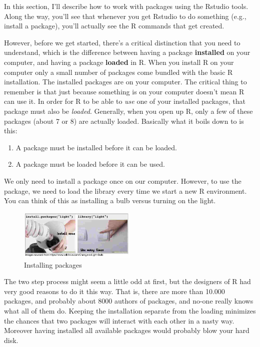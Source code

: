 \documentclass[
  12pt,
  oneside]{book}
\providecommand{\tightlist}{%
  \setlength{\itemsep}{0pt}\setlength{\parskip}{0pt}}
\begin{document}
In this section, I'll describe how to work with packages using the Rstudio tools. Along the way, you'll see that whenever you get Rstudio to do something (e.g., install a package), you'll actually see the R commands that get created.

However, before we get started, there's a critical distinction that you need to understand, which is the difference between having a package \textbf{installed} on your computer, and having a package \textbf{loaded} in R. When you install R on your computer only a small number of packages come bundled with the basic R installation. The installed packages are on your computer. The critical thing to remember is that just because something is on your computer doesn't mean R can use it. In order for R to be able to \emph{use} one of your installed packages, that package must also be \emph{loaded}. Generally, when you open up R, only a few of these packages (about 7 or 8) are actually loaded. Basically what it boils down to is this:

\begin{enumerate}
\def\labelenumi{\arabic{enumi}.}
\tightlist
\item
  A package must be installed before it can be loaded.
\item
  A package must be loaded before it can be used.
\end{enumerate}

We only need to install a package once on our computer. However, to use the package, we need to load the library every time we start a new R environment. You can think of this as installing a bulb versus turning on the light.

\begin{figure}
\centering
\includegraphics[width=0.5\textwidth,height=\textheight]{fig/lightpackage.jpeg}
\caption{\label{fig:lightpackage} Installing packages}
\end{figure}

The two step process might seem a little odd at first, but the designers of R had very good reasons to do it this way. That is, there are more than 10.000 packages, and probably about 8000 authors of packages, and no-one really knows what all of them do. Keeping the installation separate from the loading minimizes the chances that two packages will interact with each other in a nasty way. Moreover having installed all available packages would probably blow your hard disk.
\end{document}
